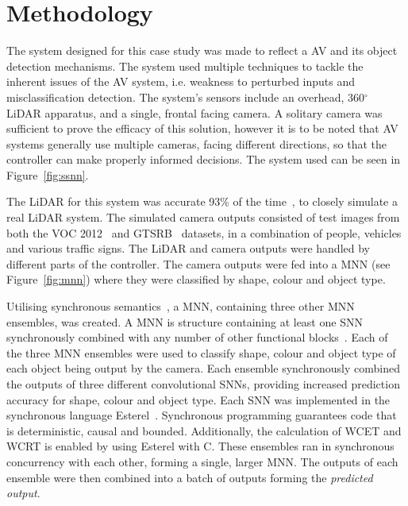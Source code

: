 \section{Methodology} 
The system designed for this case study was made to reflect a \acf{AV} and its object detection mechanisms. 
The system used multiple techniques to tackle the inherent issues of the \ac{AV} system, i.e. weakness to perturbed inputs and misclassification detection.
The system's sensors include an overhead, 360$^\circ$ \acf{LiDAR} apparatus, and a single, frontal facing camera.
A solitary camera was sufficient to prove the efficacy of this solution, however it is to be noted that \ac{AV} systems generally use multiple cameras, facing different directions, so that the controller can make properly informed decisions.
The system used can be seen in Figure~\ref{fig:ssnn}. 

The \ac{LiDAR} for this system was accurate 93\% of the time~\cite{lidarFusion}, to closely simulate a real \ac{LiDAR} system.
The simulated camera outputs consisted of test images from both the \ac{VOC} 2012~\cite{pascal-voc-2012} and \ac{GTSRB}~\cite{Stallkamp2012-gtsrb} datasets, in a combination of people, vehicles and various traffic signs.
The \ac{LiDAR} and camera outputs were handled by different parts of the controller.
The camera outputs were fed into a \ac{MNN} (see Figure~\ref{fig:mnn}) where they were classified by shape, colour and object type.

Utilising synchronous semantics~\cite{benveniste2003synchronous}, a \acf{MNN}, containing three other \ac{MNN} ensembles, was created.
A \ac{MNN} is structure containing at least one \acf{SNN}~\cite{sann} synchronously combined with any number of other functional blocks~\cite{sann}.
Each of the three \ac{MNN} ensembles were used to classify shape, colour and object type of each object being output by the camera.
Each ensemble synchronously combined the outputs of three different convolutional \acp{SNN}, providing increased prediction accuracy for shape, colour and object type. 
Each \ac{SNN} was implemented in the synchronous language Esterel~\cite{Esterel}.
Synchronous programming guarantees code that is deterministic, causal and bounded.
Additionally, the calculation of \acf{WCET} and \acf{WCRT} is enabled by using Esterel with C.
These ensembles ran in synchronous concurrency with each other, forming a single, larger \ac{MNN}. 
The outputs of each ensemble were then combined into a batch of outputs forming the \textit{predicted output}. 

